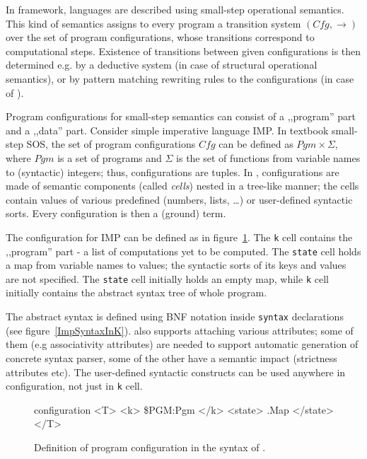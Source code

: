 \documentclass{fithesis3}
\newcommand{\var}[1]{\mathit{#1}}
\begin{document}
In \K framework, languages are described using small-step operational semantics. This kind of semantics assigns to every program a transition system $( \var{Cfg}, \rightarrow )$ over the set of program configurations, whose transitions correspond to computational steps. Existence of transitions between given configurations is then determined e.g. by a deductive system (in case of structural operational semantics), or by pattern matching rewriting rules to the configurations (in case of \K).



Program configurations for small-step semantics can consist of a ,,program'' part and a ,,data'' part. Consider simple imperative language IMP. In textbook small-step SOS, the set of program configurations $\var{Cfg}$ can be defined as $\var{Pgm} \times \Sigma$, where $\var{Pgm}$ is a set of programs and $\Sigma$ is the set of functions from variable names to (syntactic) integers; thus, configurations are tuples. In \K, configurations are made of semantic components (called \textit{cells}) nested in a tree-like manner; the cells contain values of various predefined (numbers, lists, \ldots) or user-defined syntactic sorts. Every configuration is then a (ground) term.

The configuration for IMP can be defined as in figure~\ref{ImpConfigurationInK}. The \texttt{k} cell contains the ,,program'' part - a list of computations yet to be computed. The \texttt{state} cell holds a map from variable names to values; the syntactic sorts of its keys and values are not specified. The \texttt{state} cell initially holds an empty map, while \texttt{k} cell initially contains the abstract syntax tree of whole program.

The abstract syntax is defined using BNF notation inside \texttt{syntax} declarations (see figure~\ref{ImpSyntaxInK}). \K also supports attaching various attributes; some of them (e.g associativity attributes) are needed to support automatic generation of concrete syntax parser, some of the other have a semantic impact (strictness attributes etc). The user-defined syntactic constructs can be used anywhere in configuration, not just in \texttt{k} cell.

\begin{figure}
\caption{Definition of program configuration in the syntax of \K. }
\label{ImpConfigurationInK}
\begin{asciik}
configuration <T> <k> \$PGM:Pgm </k> <state> .Map </state> </T>
\end{asciik}
\end{figure}
\end{document}
